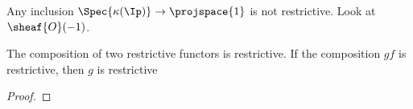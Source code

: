 
\begin{nonexample}
Any inclusion $\Spec{\kappa(\Ip)} \rightarrow \projspace{1}$ is not restrictive. Look at $\sheaf{O}(-1)$.
\end{nonexample}

\begin{lemma}
The composition of two restrictive functors is restrictive. If the composition $gf$ is restrictive, then $g$ is restrictive
\end{lemma}
\begin{proof}
\end{proof}